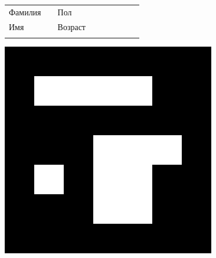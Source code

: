 \documentclass[12pt, a4paper]{article}
\begin{document}

\renewcommand{\arraystretch}{1.5}

\begin{figure}[t]
\scriptsize 
\begin{tabular}[b]{ V{2.8} m{2.0cm} V{2.8} m{6.2cm} V{2.8} m{2cm} V{2.8} m{5.3cm} V{2.8} } 
Фамилия &  & Пол & \\  [0.65cm]
Имя &  & Возраст & \\  [0.65cm]

\end{tabular}
\includegraphics[scale=0.2]{imgs/marker_2171}
\end{figure}

\setlength{\textfloatsep}{5pt plus 1.0pt minus 1.0pt}
\end{document}
